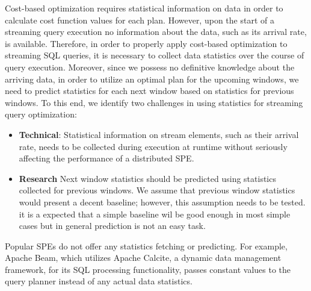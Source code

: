 Cost-based optimization requires statistical information on data in order to calculate cost function values for each plan. However, upon the start of a streaming query execution no information about the data, such as its arrival rate, is available. Therefore, in order to properly apply cost-based optimization to streaming SQL queries, it is necessary to collect data statistics over the course of query execution. Moreover, since we possess no definitive knowledge about the arriving data, in order to utilize an optimal plan for the upcoming windows, we need to predict statistics for each next window based on statistics for previous windows. To this end, we identify two challenges in using statistics for streaming query optimization:

\begin{itemize}
    \item \textbf{Technical}:
    Statistical information on stream elements, such as their arrival rate, needs to be collected during execution at runtime without seriously affecting the performance of a distributed SPE. %
    \item \textbf{Research}
    Next window statistics should be predicted using statistics collected for previous windows. We assume that previous window statistics would present a decent baseline; however, this assumption needs to be tested. it is a expected that a simple baseline wil be good enough in most simple cases but in general prediction is not an easy task.
\end{itemize}

Popular SPEs do not offer any statistics fetching or predicting. For example, Apache Beam, which utilizes Apache Calcite, a dynamic data management framework, for its SQL processing functionality, passes constant values to the query planner instead of any actual data statistics.

